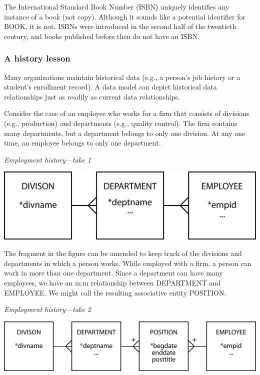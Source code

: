 \documentclass[
]{article}
\begin{document}
The International Standard Book Number (ISBN) uniquely identifies any
instance of a book (not copy). Although it sounds like a potential
identifier for BOOK, it is not. ISBNs were introduced in the second half
of the twentieth century, and books published before then do not have an
ISBN.

\hypertarget{a-history-lesson}{%
\subsubsection*{A history lesson}\label{a-history-lesson}}

Many organizations maintain historical data (e.g., a person's job
history or a student's enrollment record). A data model can depict
historical data relationships just as readily as current data
relationships.

Consider the case of an employee who works for a firm that consists of
divisions (e.g., production) and departments (e.g., quality control).
The firm contains many departments, but a department belongs to only one
division. At any one time, an employee belongs to only one department.

\emph{Employment history---take 1}

\includegraphics{Figures/Chapter 7/history-1.png}

The fragment in the figure can be amended to keep track of the divisions
and departments in which a person works. While employed with a firm, a
person can work in more than one department. Since a department can have
many employees, we have an m:m relationship between DEPARTMENT and
EMPLOYEE. We might call the resulting associative entity POSITION.

\emph{Employment history---take 2}

\includegraphics{Figures/Chapter 7/history-2.png}
\end{document}
